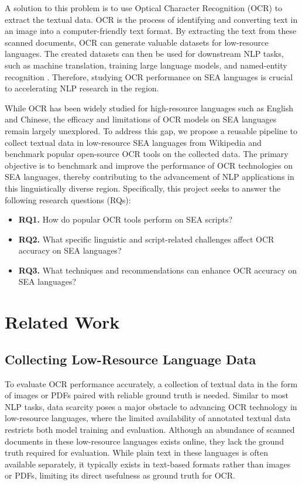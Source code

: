 \documentclass[12pt,oneside]{memoir}
\begin{document}
A solution to this problem is to use Optical Character Recognition (OCR) to extract the textual data.
OCR is the process of identifying and converting text in an image into a computer-friendly text format.
By extracting the text from these scanned documents, OCR can generate valuable datasets for low-resource languages.
The created datasets can then be used for downstream NLP tasks, such as machine translation, training large language models, and named-entity recognition \parencite{agarwal-and-anastasopoulos-2024, ignat-etal-2022}.
Therefore, studying OCR performance on SEA languages is crucial to accelerating NLP research in the region.

While OCR has been widely studied for high-resource languages such as English and Chinese, the efficacy and limitations of OCR models on SEA languages remain largely unexplored.
To address this gap, we propose a reusable pipeline to collect textual data in low-resource SEA languages from Wikipedia and benchmark popular open-source OCR tools on the collected data.
The primary objective is to benchmark and improve the performance of OCR technologies on SEA languages, thereby contributing to the advancement of NLP applications in this linguistically diverse region.
Specifically, this project seeks to answer the following research questions (RQs):

\begin{itemize}
    \item \textbf{RQ1.} How do popular OCR tools perform on SEA scripts?
    \item \textbf{RQ2.} What specific linguistic and script-related challenges affect OCR accuracy on SEA languages?
    \item \textbf{RQ3.} What techniques and recommendations can enhance OCR accuracy on SEA languages?
\end{itemize}

\chapter{Related Work}

\section{Collecting Low-Resource Language Data}
To evaluate OCR performance accurately, a collection of textual data in the form of images or PDFs paired with reliable ground truth is needed.
Similar to most NLP tasks, data scarcity poses a major obstacle to advancing OCR technology in low-resource languages, where the limited availability of annotated textual data restricts both model training and evaluation.
Although an abundance of scanned documents in these low-resource languages exists online, they lack the ground truth required for evaluation.
While plain text in these languages is often available separately, it typically exists in text-based formats rather than images or PDFs, limiting its direct usefulness as ground truth for OCR.
\end{document}
